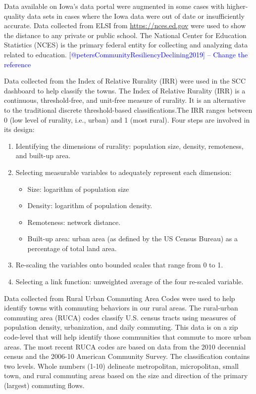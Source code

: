 \documentclass[letterpaper,inpress]{jdsart}
\begin{document}
Data available on Iowa's data portal were augmented in some cases with higher-quality data sets in cases where the Iowa data were out of date or insufficiently accurate.
Data collected from ELSI from \url{https://nces.ed.gov} were used to show the distance to any private or public school. The National Center for Education Statistics (NCES) is the primary federal entity for collecting and analyzing data related to education. {\textcolor{blue}{[@petersCommunityResiliencyDeclining2019] -- Change the reference}}

Data collected from the Index of Relative Rurality (IRR) \citep{Rural_classification} were used in the SCC dashboard to help classify the towns. The Index of Relative Rurality (IRR) is a continuous, threshold-free, and unit-free measure of rurality. It is an alternative to the traditional discrete threshold-based classifications.The IRR ranges between 0 (low level of rurality, i.e., urban) and 1 (most rural). Four steps are involved in its design:

\begin{enumerate}
\item Identifying the dimensions of rurality: population size, density, remoteness, and built-up area.
\item Selecting measurable variables to adequately represent each dimension:
    \begin{itemize}
        \item Size: logarithm of population size
        \item Density: logarithm of population density.
        \item Remoteness: network distance.
        \item Built-up area: urban area (as defined by the US Census Bureau) as a percentage of total land area.
    \end{itemize}
\item Re-scaling the variables onto bounded scales that range from 0 to 1.
\item Selecting a link function: unweighted average of the four re-scaled variable.
\end{enumerate}

Data collected from Rural Urban Commuting Area Codes \citep{usda} were used to help identify towns with commuting behaviors in our rural areas. The rural-urban commuting area (RUCA) codes classify U.S. census tracts using measures of population density, urbanization, and daily commuting. This data is on a zip code-level that will help identify those communities that commute to more urban areas. The most recent RUCA codes are based on data from the 2010 decennial census and the 2006-10 American Community Survey. The classification contains two levels. Whole numbers (1-10) delineate metropolitan, micropolitan, small town, and rural commuting areas based on the size and direction of the primary (largest) commuting flows.
\end{document}
